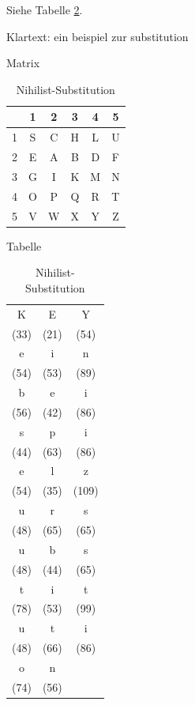 \begin{refsegment}
\begin{itemize}
   Siehe Tabelle \ref{Nihilist-substitution-table-reference}.
	
   Klartext: ein beispiel zur substitution

   \begin{table}[ht]

   \begin{center}
   Matrix~~   %
   \begin{tabular}{|c|ccccc|}
   \hline 	
	  & 1 & 2 & 3 & 4 & 5\\
   \hline
	1 & S & C & H & L & U\\
	2 & E & A & B & D & F\\
	3 & G & I & K & M & N\\
	4 & O & P & Q & R & T\\
	5 & V & W & X & Y & Z\\
   \hline
   \end{tabular}
   \end{center}

   \begin{center}
   Tabelle~~
   \begin{tabular}{|ccc|}
   \hline 	
	K & E & Y\\
	(33) & (21) & (54)\\
   \hline
	e & i & n\\
	(54) & (53) & (89)\\
	b & e & i\\
	(56) & (42) & (86)\\
	s & p & i\\
	(44) & (63) & (86)\\
	e & l & z\\
	(54) & (35) & (109)\\
	u & r & s\\
	(48) & (65) & (65)\\
	u & b & s\\
	(48) & (44) & (65)\\
	t & i & t\\
	(78) & (53) & (99)\\
	u & t & i\\
	(48) & (66) & (86)\\
	o & n &   \\	
	(74) & (56)&   \\
   \hline
   \end{tabular}
   \caption{Nihilist-Substitution}
   \label{Nihilist-substitution-table-reference} %
   \end{center}


\end{table}
\end{itemize}
\end{refsegment}

